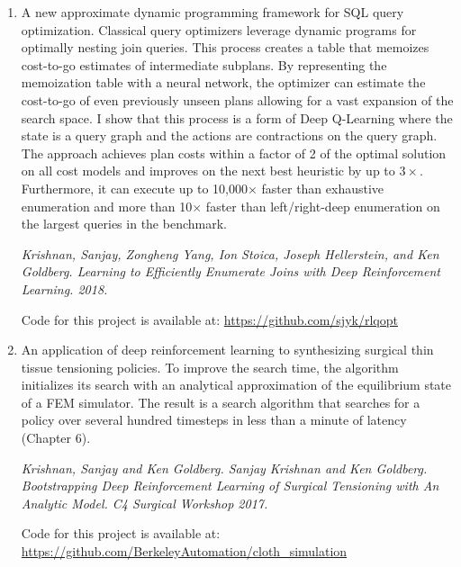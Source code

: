 \begin{enumerate}
    \item A new approximate dynamic programming framework for SQL query optimization. Classical query optimizers leverage dynamic programs for optimally nesting join queries. This process creates a table that memoizes cost-to-go estimates of intermediate subplans. By representing the memoization table with a neural network, the optimizer can estimate the cost-to-go of even previously unseen plans allowing for a vast expansion of the search space. I show that this process is a form of Deep Q-Learning where the state is a query graph and the actions are contractions on the query graph. The approach achieves plan costs within a factor of 2 of the optimal solution on all cost models and improves on the next best heuristic by up to $3\times$. Furthermore, it can execute up to 10,000$\times$ faster
than exhaustive enumeration and more than 10$\times$ faster than left/right-deep enumeration on the largest queries in the benchmark.

    \emph{Krishnan, Sanjay, Zongheng Yang, Ion Stoica, Joseph Hellerstein, and Ken Goldberg. Learning to Efficiently Enumerate Joins with Deep Reinforcement Learning. 2018.}

    Code for this project is available at: \url{https://github.com/sjyk/rlqopt}
    
    \item An application of deep reinforcement learning to synthesizing surgical thin tissue tensioning policies. To improve the search time, the algorithm initializes its search with an analytical approximation of the equilibrium state of a FEM simulator. The result is a search algorithm that searches for a policy over several hundred timesteps in less than a minute of latency (Chapter 6). 

     \emph{Krishnan, Sanjay and Ken Goldberg. Sanjay Krishnan and Ken Goldberg. Bootstrapping Deep Reinforcement Learning of Surgical Tensioning with An Analytic Model. C4 Surgical Workshop 2017.}

     Code for this project is available at: \url{https://github.com/BerkeleyAutomation/cloth_simulation}
    
\end{enumerate}





